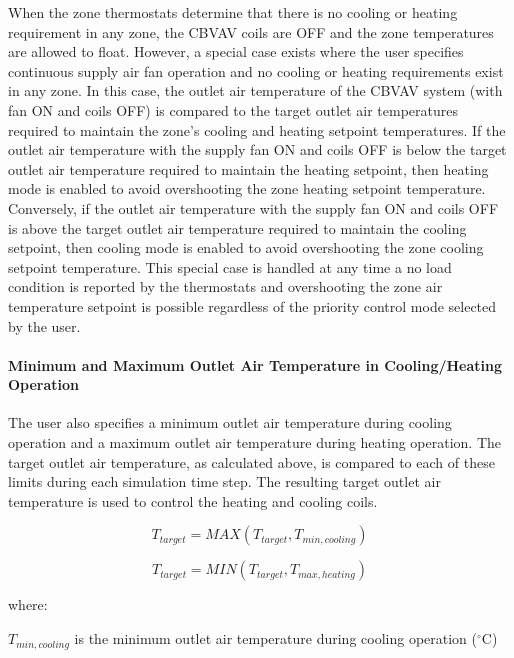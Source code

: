 When the zone thermostats determine that there is no cooling or heating requirement in any zone, the CBVAV coils are OFF and the zone temperatures are allowed to float. However, a special case exists where the user specifies continuous supply air fan operation and no cooling or heating requirements exist in any zone. In this case, the outlet air temperature of the CBVAV system (with fan ON and coils OFF) is compared to the target outlet air temperatures required to maintain the zone's cooling and heating setpoint temperatures. If the outlet air temperature with the supply fan ON and coils OFF is below the target outlet air temperature required to maintain the heating setpoint, then heating mode is enabled to avoid overshooting the zone heating setpoint temperature. Conversely, if the outlet air temperature with the supply fan ON and coils OFF is above the target outlet air temperature required to maintain the cooling setpoint, then cooling mode is enabled to avoid overshooting the zone cooling setpoint temperature. This special case is handled at any time a no load condition is reported by the thermostats and overshooting the zone air temperature setpoint is possible regardless of the priority control mode selected by the user.

\paragraph{Minimum and Maximum Outlet Air Temperature in Cooling/Heating Operation}\label{minimum-and-maximum-outlet-air-temperature-in-coolingheating-operation}

The user also specifies a minimum outlet air temperature during cooling operation and a maximum outlet air temperature during heating operation. The target outlet air temperature, as calculated above, is compared to each of these limits during each simulation time step. The resulting target outlet air temperature is used to control the heating and cooling coils.

\begin{equation}
{T_{target}} = MAX\left( {{T_{target}},{T_{min,cooling}}} \right)
\end{equation}

\begin{equation}
{T_{target}} = MIN\left( {{T_{target}},{T_{max,heating}}} \right)
\end{equation}

where:

\({T_{min,cooling}}\) is the minimum outlet air temperature during cooling operation (\(^{\circ}\)C)

